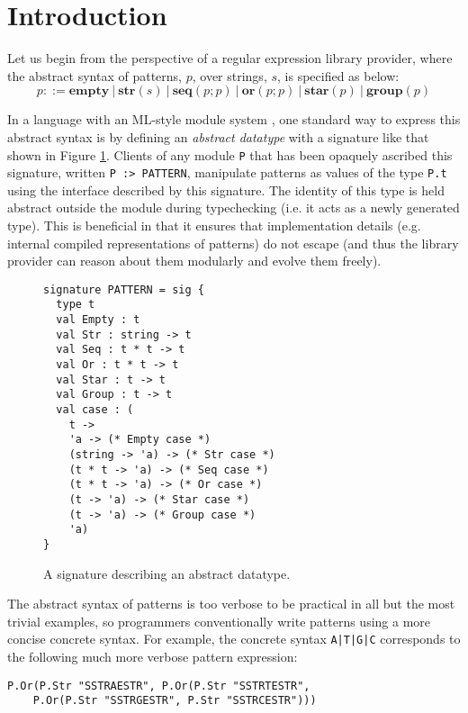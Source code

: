 \documentclass[preprint]{sigplanconf}
\begin{document}
\section{Introduction}\label{intro}
Let us begin from the perspective of a regular expression library provider, where the abstract syntax of {patterns}, $p$, over strings, $s$, is specified as below:\[p ::= \textbf{empty} ~|~ \textbf{str}(s) ~|~ \textbf{seq}(p; p) ~|~ \textbf{or}(p; p) ~|~ \textbf{star}(p) ~|~ \textbf{group}(p)\]

In a language with an ML-style module system \cite{MacQueen:1984:MSM:800055.802036}, one standard way to express this abstract syntax is by defining an \emph{abstract datatype} with a signature like that shown in Figure \ref{fig:PATTERN}. Clients of any module \lstinline{P} that has been opaquely ascribed this signature, written \lstinline{P :> PATTERN}, manipulate patterns as values of the type \verb|P.t| using the interface described by this signature. The identity of this type is held abstract outside the module during typechecking (i.e. it acts as a newly generated type). This is beneficial in that it ensures that implementation details (e.g. internal compiled representations of patterns) do not escape (and thus the library provider can reason about them modularly and evolve them freely).

\begin{figure}
\begin{lstlisting}[deletekeywords={case},numbers=none]
signature PATTERN = sig {
  type t
  val Empty : t
  val Str : string -> t
  val Seq : t * t -> t
  val Or : t * t -> t
  val Star : t -> t
  val Group : t -> t
  val case : (
    t -> 
    'a -> (* Empty case *)
    (string -> 'a) -> (* Str case *)
    (t * t -> 'a) -> (* Seq case *)
    (t * t -> 'a) -> (* Or case *)
    (t -> 'a) -> (* Star case *)
    (t -> 'a) -> (* Group case *)
    'a)
}
\end{lstlisting}
\caption{A signature describing an abstract datatype.}
\label{fig:PATTERN}
\end{figure}

The abstract syntax of patterns is too verbose to be practical  in all but the most trivial examples, so programmers conventionally write patterns using a more concise concrete syntax. For example, the concrete syntax \lstinline{A|T|G|C} corresponds to the following much more verbose pattern expression:
\begin{lstlisting}[numbers=none,mathescape=|]
P.Or(P.Str "SSTRAESTR", P.Or(P.Str "SSTRTESTR", 
	P.Or(P.Str "SSTRGESTR", P.Str "SSTRCESTR")))
\end{lstlisting} 
\end{document}
